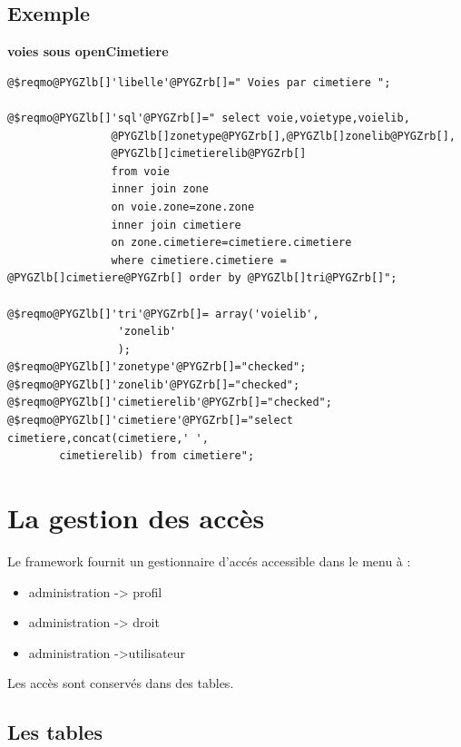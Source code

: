 \documentclass[letterpaper,10pt,french]{manual}
\begin{document}
\subsection{Exemple}

\textbf{voies sous openCimetiere}

\begin{Verbatim}[commandchars=@\[\]]
@$reqmo@PYGZlb[]'libelle'@PYGZrb[]=" Voies par cimetiere ";

@$reqmo@PYGZlb[]'sql'@PYGZrb[]=" select voie,voietype,voielib,
                @PYGZlb[]zonetype@PYGZrb[],@PYGZlb[]zonelib@PYGZrb[],
                @PYGZlb[]cimetierelib@PYGZrb[]
                from voie
                inner join zone
                on voie.zone=zone.zone
                inner join cimetiere
                on zone.cimetiere=cimetiere.cimetiere
                where cimetiere.cimetiere = @PYGZlb[]cimetiere@PYGZrb[] order by @PYGZlb[]tri@PYGZrb[]";

@$reqmo@PYGZlb[]'tri'@PYGZrb[]= array('voielib',
                 'zonelib'
                 );
@$reqmo@PYGZlb[]'zonetype'@PYGZrb[]="checked";
@$reqmo@PYGZlb[]'zonelib'@PYGZrb[]="checked";
@$reqmo@PYGZlb[]'cimetierelib'@PYGZrb[]="checked";
@$reqmo@PYGZlb[]'cimetiere'@PYGZrb[]="select cimetiere,concat(cimetiere,' ',
        cimetierelib) from cimetiere";
\end{Verbatim}

\resetcurrentobjects
\hypertarget{--doc-framework/acces}{}\begin{quote}
\hypertarget{acces}{}\end{quote}


\section{La gestion des accès}

Le framework fournit un gestionnaire d'accés accessible dans le menu à :
\begin{itemize}
\item {} 
administration -\textgreater{} profil

\item {} 
administration -\textgreater{} droit

\item {} 
administration -\textgreater{}utilisateur

\end{itemize}

Les accès sont conservés dans des tables.


\subsection{Les tables}
\end{document}
